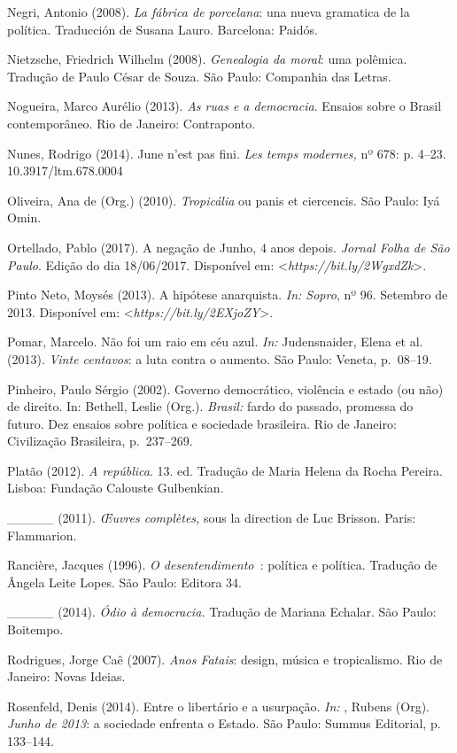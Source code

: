 Negri, Antonio (2008). \emph{La fábrica de porcelana}: una nueva
gramatica de la política. Traducción de Susana Lauro. Barcelona: Paidós.

Nietzsche, Friedrich Wilhelm (2008). \emph{Genealogia da moral}: uma
polêmica. Tradução de Paulo César de Souza. São Paulo: Companhia das
Letras.

Nogueira, Marco Aurélio (2013). \emph{As ruas e a democracia}. Ensaios
sobre o Brasil contemporâneo. Rio de Janeiro: Contraponto.

Nunes, Rodrigo (2014). June n'est pas fini. \emph{Les temps modernes,}
nº 678: p. 4--23. 10.3917/ltm.678.0004

Oliveira, Ana de (Org.) (2010). \emph{Tropicália }ou panis et
ciercencis. São Paulo: Iyá Omin.

Ortellado, Pablo (2017). A negação de Junho, 4 anos depois. \emph{Jornal
Folha de São Paulo}. Edição do dia 18/06/2017. Disponível em:
\textless{}\emph{https://bit.ly/2WgxdZk}\textgreater{}.

Pinto Neto, Moysés (2013). A hipótese anarquista. \emph{In: Sopro}, nº
96. Setembro de 2013. Disponível em:
\textless{}\emph{https://bit.ly/2EXjoZY}\textgreater{}.

Pomar, Marcelo. Não foi um raio em céu azul. \emph{In: }Judensnaider,
Elena et al. (2013). \emph{Vinte centavos}: a luta contra o aumento. São
Paulo: Veneta, p.~08--19.

Pinheiro, Paulo Sérgio (2002). Governo democrático, violência e estado
(ou não) de direito. In: Bethell, Leslie (Org.). \emph{Brasil:} fardo do
passado, promessa do futuro. Dez ensaios sobre política e sociedade
brasileira. Rio de Janeiro: Civilização Brasileira, p.~237--269.

Platão (2012). \emph{A república}. 13. ed. Tradução de Maria Helena da
Rocha Pereira. Lisboa: Fundação Calouste Gulbenkian.

\_\_\_\_\_ (2011). \emph{Œuvres complètes, }sous la direction de Luc
Brisson. Paris: Flammarion.

Rancière, Jacques (1996). \emph{O desentendimento~}: política e
política. Tradução de Ângela Leite Lopes. São Paulo: Editora 34.

\_\_\_\_\_ (2014). \emph{Ódio à democracia. }Tradução de Mariana
Echalar. São Paulo: Boitempo.

Rodrigues, Jorge Caê (2007). \emph{Anos Fatais}: design, música e
tropicalismo. Rio de Janeiro: Novas Ideias.

Rosenfeld, Denis (2014). Entre o libertário e a usurpação. \emph{In:
}, Rubens (Org). \emph{Junho de 2013}: a sociedade enfrenta o
Estado. São Paulo: Summus Editorial, p. 133--144.

